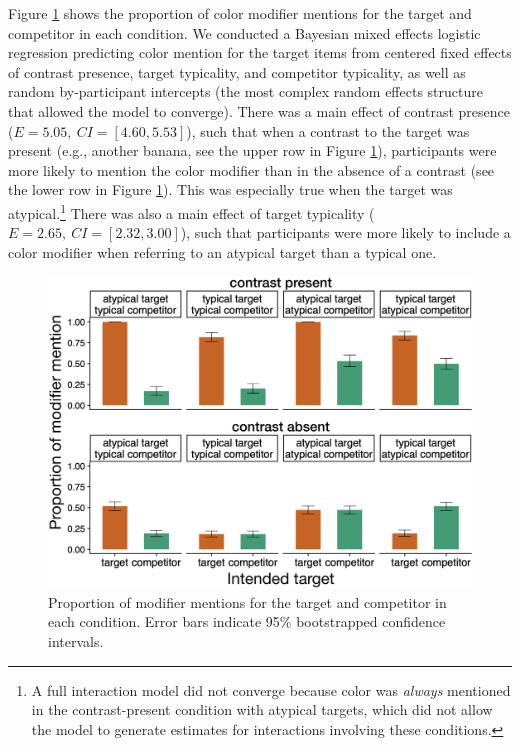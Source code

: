 \documentclass[10pt,letterpaper]{article}
\newcommand{\ek}[1]{\textcolor{Orange}{[ek: #1]}}
\newcommand{\figref}[1]{Figure \ref{#1}}
\begin{document}
\figref{prod-results} shows the proportion of color modifier mentions for the target and competitor in each condition. We conducted a Bayesian mixed effects logistic regression predicting color mention for the target items from centered fixed effects of contrast presence, target typicality, and competitor typicality, as well as random by-participant intercepts (the most complex random effects structure that allowed the model to converge).%
There was a main effect of contrast presence ($E=5.05,\ CI=[4.60,5.53]$), such that when a contrast to the target was present (e.g., another banana, see the upper row in \figref{prod-results}), participants were more likely to mention the color modifier than in the absence of a contrast (see the lower row in \figref{prod-results}). This was especially true when the target was atypical.\footnote{A full interaction model did not converge because color was \emph{always} mentioned in the contrast-present condition with atypical targets, which did not allow the model to generate estimates for interactions involving these conditions.} There was also a main effect of target typicality ($E=2.65,\ CI=[2.32,3.00]$), such that participants were more likely to include a color modifier when referring to an atypical target than a typical one.

\begin{figure}
	\begin{center}
		\includegraphics[width=.475\textwidth]{graphs/prod-bycond-paper.pdf}
	\end{center}
\caption{Proportion of modifier mentions for the target and competitor in each condition. Error bars indicate 95\% bootstrapped confidence intervals.} 
\label{prod-results}
\end{figure}
\end{document}
